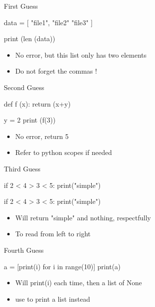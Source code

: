 \documentclass[serif, aspectratio=169]{beamer}
\begin{document}
\begin{frame}[fragile]{First Guess}
    \begin{pythoncode}
    data = [
        "file1",
        "file2"
        "file3"
    ]

    print (len (data))
    \end{pythoncode}
    \vfill
    \pause
    \begin{itemize}
        \item No error, but this list only has two elements
        \item Do not forget the commas !
    \end{itemize}
\end{frame}

\begin{frame}[fragile]{Second Guess}
    \begin{pythoncode}
    def f (x):
        return (x+y)

    y = 2
    print (f(3))
    \end{pythoncode}
    \vfill
    \pause
    \begin{itemize}
        \item No error, return 5
        \item Refer to python scopes if needed
    \end{itemize}
\end{frame}

\begin{frame}[fragile]{Third Guess}
    \begin{pythoncode}
    if 2 < 4 > 3 < 5:
        print("simple")
    
    if 2 < 4 > 3 < 5:
        print("simple")
    \end{pythoncode}
    \vfill
    \pause
    \begin{itemize}
        \item Will return "simple" and nothing, respectfully
        \item To read from left to right
    \end{itemize}
\end{frame}

\begin{frame}[fragile]{Fourth Guess}
    \begin{pythoncode}
    a = [print(i) for i in range(10)]
    print(a)
    \end{pythoncode}
    \vfill
    \pause
    \begin{itemize}
        \item Will print(i) each time, then a list of None
        \item use  to print a list instead
    \end{itemize}
\end{frame}
\end{document}
